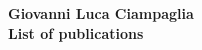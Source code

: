 \documentclass{article}
\begin{document}
\noindent \LARGE{\bf Giovanni Luca Ciampaglia}\\[1em]
\noindent \Large{\bf List of publications}


\end{document}
